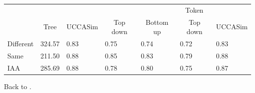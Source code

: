 \documentclass{beamer}
\begin{document}
\begin{frame}[label=distances]
	\begin{table}[]
		\centering
		\footnotesize
		\begin{tabular}{l|l|l|l|l|l|l|}
			&                                    &                              &                               & \multicolumn{3}{c|}{Token}                                                          \\ \cline{2-7} 
			& \multicolumn{1}{c|}{Tree} & \multicolumn{1}{c|}{UCCASim} & \multicolumn{1}{c|}{Top down} & \multicolumn{1}{c|}{Bottom up} & \multicolumn{1}{c|}{Top down} & \multicolumn{1}{c|}{UCCASim} \\ \cline{2-7} 
			Different                 & 324.57                             & 0.83                         & 0.75                          & 0.74                           & 0.72                          & 0.83                         \\
			Same                      & 211.50                             & 0.88                         & 0.85                          & 0.83                           & 0.79                          & 0.88                         \\ \hline
			\multicolumn{1}{|l|}{IAA} & 285.69                             & 0.88                         & 0.78                          & 0.80                           & 0.75                          & 0.87                         \\ \hline
		\end{tabular}
	\end{table}
	\small Back to \hyperlink{distances-details}{}.
\end{frame}
\end{document}
